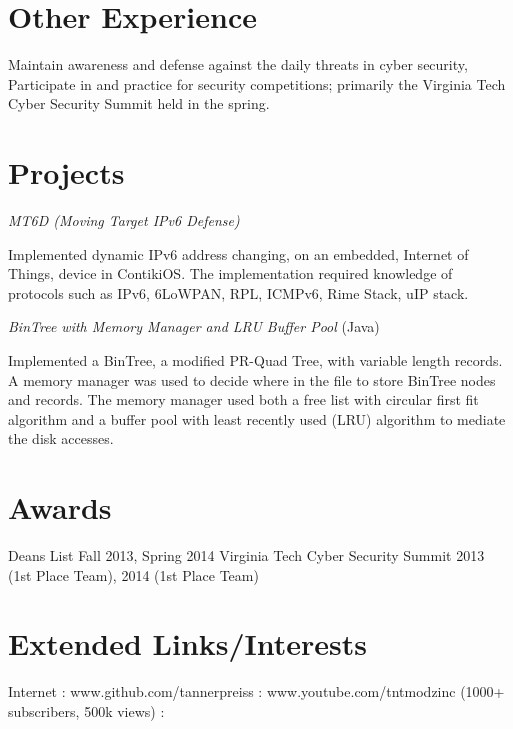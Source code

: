 \documentclass{tpreiss_cv}
\begin{document}
\section{Other Experience} 
Maintain awareness and defense against the daily threats in cyber security, Participate in and practice for security competitions; primarily the Virginia Tech Cyber Security Summit held in the spring.

\section{Projects}


\textit{MT6D (Moving Target IPv6 Defense)}

Implemented dynamic IPv6 address changing, on an embedded, Internet of Things, device in ContikiOS. The implementation required knowledge of protocols such as IPv6, 6LoWPAN, RPL, ICMPv6, Rime Stack, uIP stack.

\textit{BinTree with Memory Manager and LRU Buffer Pool} (Java)

Implemented a BinTree, a modified PR-Quad Tree, with variable length records. A memory manager was used to decide where in the file to store BinTree nodes and records. The memory manager used both a free list with circular first fit algorithm and a buffer pool with least recently used (LRU) algorithm to mediate the disk accesses.

\section{Awards}
Deans List Fall 2013, Spring 2014                  
Virginia Tech Cyber Security Summit 2013 (1st Place Team), 2014 (1st Place Team)

\section{Extended Links/Interests}

Internet : www.github.com/tannerpreiss  :  www.youtube.com/tntmodzinc  (1000+ subscribers, 500k views) :
\end{document}
